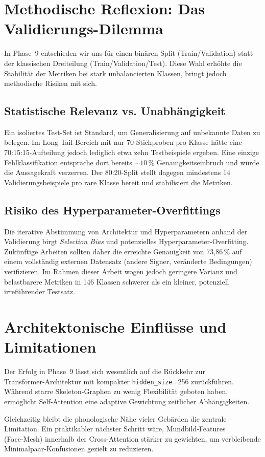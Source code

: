 \section{Methodische Reflexion: Das Validierungs-Dilemma}
In Phase~9 entschieden wir uns für einen binären Split (Train/Validation) statt der klassischen Dreiteilung (Train/Validation/Test). Diese Wahl erhöhte die Stabilität der Metriken bei stark unbalancierten Klassen, bringt jedoch methodische Risiken mit sich.

\subsection{Statistische Relevanz vs. Unabhängigkeit}
Ein isoliertes Test-Set ist Standard, um Generalisierung auf unbekannte Daten zu belegen. Im Long-Tail-Bereich mit nur 70 Stichproben pro Klasse hätte eine 70:15:15-Aufteilung jedoch lediglich etwa zehn Testbeispiele ergeben. Eine einzige Fehlklassifikation entspräche dort bereits \(\sim 10\,\%\) Genauigkeitseinbruch und würde die Aussagekraft verzerren. Der 80:20-Split stellt dagegen mindestens 14 Validierungsbeispiele pro rare Klasse bereit und stabilisiert die Metriken.

\subsection{Risiko des Hyperparameter-Overfittings}
Die iterative Abstimmung von Architektur und Hyperparametern anhand der Validierung birgt \textit{Selection Bias} und potenzielles Hyperparameter-Overfitting. Zukünftige Arbeiten sollten daher die erreichte Genauigkeit von 73{,}86\,\% auf einem vollständig externen Datensatz (andere Signer, veränderte Bedingungen) verifizieren. Im Rahmen dieser Arbeit wogen jedoch geringere Varianz und belastbarere Metriken in 146 Klassen schwerer als ein kleiner, potenziell irreführender Testsatz.
\section{Architektonische Einflüsse und Limitationen}
Der Erfolg in Phase~9 lässt sich wesentlich auf die Rückkehr zur Transformer‑Architektur mit kompakter \texttt{hidden\_size}=256 zurückführen. Während starre Skeleton‑Graphen zu wenig Flexibilität geboten haben, ermöglicht Self‑Attention eine adaptive Gewichtung zeitlicher Abhängigkeiten.

Gleichzeitig bleibt die phonologische Nähe vieler Gebärden die zentrale Limitation. Ein praktikabler nächster Schritt wäre, Mundbild‑Features (Face‑Mesh) innerhalb der Cross‑Attention stärker zu gewichten, um verbleibende Minimalpaar‑Konfusionen gezielt zu reduzieren.